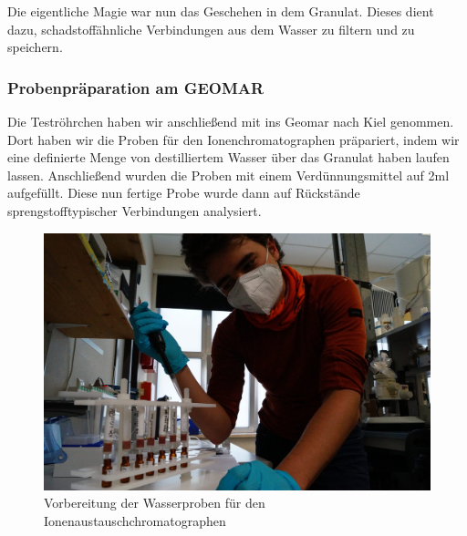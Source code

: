 Die eigentliche Magie war nun das Geschehen in dem Granulat. Dieses dient dazu, schadstoffähnliche Verbindungen aus dem Wasser zu filtern und zu speichern. 

\subsubsection{Probenpräparation am GEOMAR}
Die Teströhrchen haben wir anschließend mit ins Geomar nach Kiel genommen. Dort haben wir die Proben für den Ionenchromatographen präpariert, indem wir eine definierte Menge von destilliertem Wasser über das Granulat haben laufen lassen. Anschließend wurden die Proben mit einem Verdünnungsmittel auf 2ml aufgefüllt. Diese nun fertige Probe wurde dann auf Rückstände sprengstofftypischer Verbindungen analysiert.
\begin{figure}[]
    \centering
    \includegraphics[width=0.8\linewidth]{Bilder/DSC05766-scaled.jpg}
    \caption{Vorbereitung der Wasserproben für den Ionenaustauschchromatographen}
    \label{fig:praep}
\end{figure}